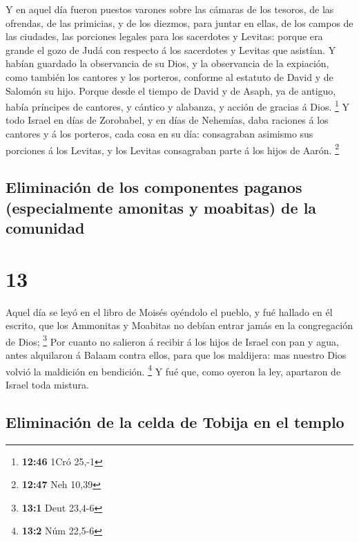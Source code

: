  Y en aquel día fueron puestos varones sobre las cámaras
de los tesoros, de las ofrendas, de las primicias, y de los diezmos,
para juntar en ellas, de los campos de las ciudades, las porciones
legales para los sacerdotes y Levitas: porque era grande el gozo de Judá
con respecto á los sacerdotes y Levitas que asistían.  Y
habían guardado la observancia de su Dios, y la observancia de la
expiación, como también los cantores y los porteros, conforme al
estatuto de David y de Salomón su hijo.  Porque desde el
tiempo de David y de Asaph, ya de antiguo, había príncipes de cantores,
y cántico y alabanza, y acción de gracias á Dios. \footnote{\textbf{12:46}
  1Cró 25,-1}  Y todo Israel en días de Zorobabel, y en
días de Nehemías, daba raciones á los cantores y á los porteros, cada
cosa en su día: consagraban asimismo sus porciones á los Levitas, y los
Levitas consagraban parte á los hijos de Aarón. \footnote{\textbf{12:47}
  Neh 10,39}

\hypertarget{eliminaciuxf3n-de-los-componentes-paganos-especialmente-amonitas-y-moabitas-de-la-comunidad}{%
\subsection{Eliminación de los componentes paganos (especialmente
amonitas y moabitas) de la
comunidad}\label{eliminaciuxf3n-de-los-componentes-paganos-especialmente-amonitas-y-moabitas-de-la-comunidad}}

\hypertarget{section-12}{%
\section{13}\label{section-12}}

 Aquel día se leyó en el libro de Moisés oyéndolo el
pueblo, y fué hallado en él escrito, que los Ammonitas y Moabitas no
debían entrar jamás en la congregación de Dios; \footnote{\textbf{13:1}
  Deut 23,4-6}  Por cuanto no salieron á recibir á los
hijos de Israel con pan y agua, antes alquilaron á Balaam contra ellos,
para que los maldijera: mas nuestro Dios volvió la maldición en
bendición. \footnote{\textbf{13:2} Núm 22,5-6}  Y fué que,
como oyeron la ley, apartaron de Israel toda mistura.

\hypertarget{eliminaciuxf3n-de-la-celda-de-tobija-en-el-templo}{%
\subsection{Eliminación de la celda de Tobija en el
templo}\label{eliminaciuxf3n-de-la-celda-de-tobija-en-el-templo}}

